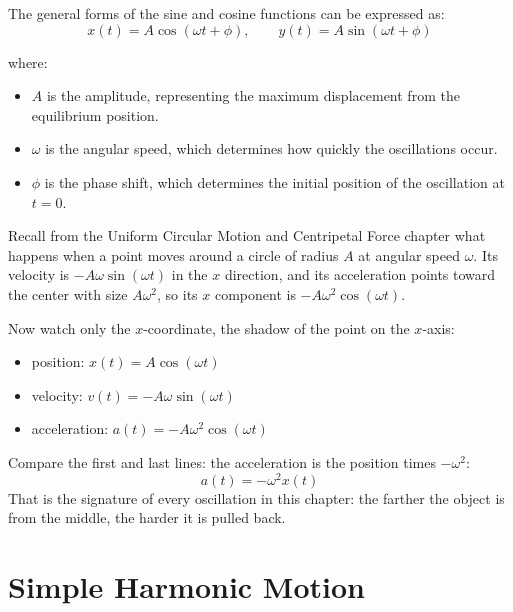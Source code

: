 The general forms of the sine and cosine functions can be expressed as:
\[
	x(t) = A\cos(\omega t + \phi), \qquad y(t) = A\sin(\omega t + \phi)
\]

where:
\begin{itemize}
	\item $A$ is the amplitude, representing the maximum displacement from the
		equilibrium position.

	\item $\omega$ is the angular speed, which determines how quickly the
		oscillations occur.

	\item $\phi$ is the phase shift, which determines the initial position of the
		oscillation at $t = 0$.
\end{itemize}

Recall from the Uniform Circular Motion and Centripetal Force chapter what happens when a point moves
around a circle of radius $A$ at angular speed $\omega$. Its velocity is
$-A\omega\sin(\omega t)$ in the $x$ direction, and its acceleration points
toward the center with size $A\omega^2$, so its $x$ component is
$-A\omega^2\cos(\omega t)$.

Now watch only the $x$-coordinate, the shadow of the point on the $x$-axis:
\begin{itemize}
	\item position: $x(t) = A\cos(\omega t)$
	\item velocity: $v(t) = -A\omega \sin(\omega t)$
	\item acceleration: $a(t) = -A\omega^{2}\cos(\omega t)$
\end{itemize}
Compare the first and last lines: the acceleration is the position times
$-\omega^2$:
$$a(t) = -\omega^{2}x(t)$$
That is the signature of every oscillation in this chapter: the farther
the object is from the middle, the harder it is pulled back.

\section{Simple Harmonic Motion}


